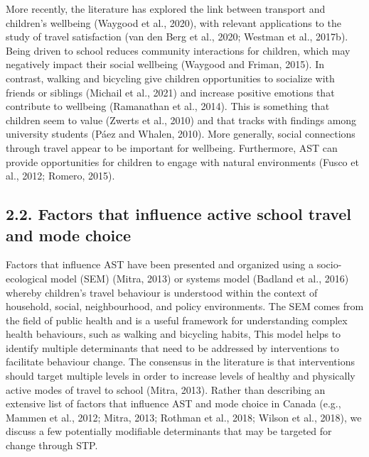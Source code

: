 \documentclass[]{elsarticle} %
\begin{document}
More recently, the literature has explored the link between transport
and children's wellbeing (Waygood et al., 2020), with relevant
applications to the study of travel satisfaction (van den Berg et al.,
2020; Westman et al., 2017b). Being driven to school reduces community
interactions for children, which may negatively impact their social
wellbeing (Waygood and Friman, 2015). In contrast, walking and bicycling
give children opportunities to socialize with friends or siblings
(Michail et al., 2021) and increase positive emotions that contribute to
wellbeing (Ramanathan et al., 2014). This is something that children
seem to value (Zwerts et al., 2010) and that tracks with findings among
university students (Páez and Whalen, 2010). More generally, social
connections through travel appear to be important for wellbeing.
Furthermore, AST can provide opportunities for children to engage with
natural environments (Fusco et al., 2012; Romero, 2015).

\hypertarget{factors-that-influence-active-school-travel-and-mode-choice}{%
\subsection{2.2. Factors that influence active school travel and mode
choice}\label{factors-that-influence-active-school-travel-and-mode-choice}}

Factors that influence AST have been presented and organized using a
socio-ecological model (SEM) (Mitra, 2013) or systems model (Badland et
al., 2016) whereby children's travel behaviour is understood within the
context of household, social, neighbourhood, and policy environments.
The SEM comes from the field of public health and is a useful framework
for understanding complex health behaviours, such as walking and
bicycling habits, This model helps to identify multiple determinants
that need to be addressed by interventions to facilitate behaviour
change. The consensus in the literature is that interventions should
target multiple levels in order to increase levels of healthy and
physically active modes of travel to school (Mitra, 2013). Rather than
describing an extensive list of factors that influence AST and mode
choice in Canada (e.g., Mammen et al., 2012; Mitra, 2013; Rothman et
al., 2018; Wilson et al., 2018), we discuss a few potentially modifiable
determinants that may be targeted for change through STP.
\end{document}
